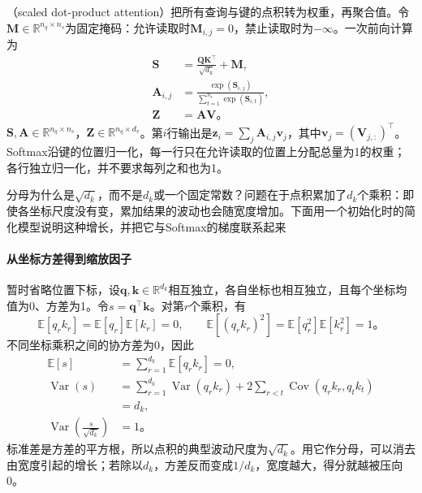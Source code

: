 （scaled dot-product attention）把所有查询与键的点积转为权重，再聚合值。令$\bm M\in\mathbb R^{n_q\times n_s}$为固定掩码：允许读取时$\bm M_{i,j}=0$，禁止读取时为$-\infty$。一次前向计算为
\begin{equation}
  \begin{aligned}
    \bm S&=\frac{\bm Q\bm K^{\top}}{\sqrt{d_k}}+\bm M,\\
    \bm A_{i,j}&=\frac{\exp(\bm S_{i,j})}
      {\sum_{t=1}^{n_s}\exp(\bm S_{i,t})},\\
    \bm Z&=\bm A\bm V\text{。}
  \end{aligned}
  \label{eq:transformer-attention}
\end{equation}
$\bm S,\bm A\in\mathbb R^{n_q\times n_s}$，$\bm Z\in\mathbb R^{n_q\times d_v}$。第$i$行输出是$\bm z_i=\sum_j\bm A_{i,j}\bm v_j$，其中$\bm v_j=(\bm V_{j,:})^{\top}$。Softmax沿键的位置归一化，每一行只在允许读取的位置上分配总量为1的权重；各行独立归一化，并不要求每列之和也为1。

分母为什么是$\sqrt{d_k}$，而不是$d_k$或一个固定常数？问题在于点积累加了$d_k$个乘积：即使各坐标尺度没有变，累加结果的波动也会随宽度增加。下面用一个初始化时的简化模型说明这种增长，并把它与Softmax的梯度联系起来

\paragraph{从坐标方差得到缩放因子}
暂时省略位置下标，设$\bm q,\bm k\in\mathbb R^{d_k}$相互独立，各自坐标也相互独立，且每个坐标均值为0、方差为1。令$s=\bm q^{\top}\bm k$。对第$r$个乘积，有
\[
  \mathbb E[q_rk_r]=\mathbb E[q_r]\mathbb E[k_r]=0,\qquad
  \mathbb E[(q_rk_r)^2]=\mathbb E[q_r^2]\mathbb E[k_r^2]=1\text{。}
\]
不同坐标乘积之间的协方差为0，因此
\begin{equation}
  \begin{aligned}
    \mathbb E[s]&=\sum_{r=1}^{d_k}\mathbb E[q_rk_r]=0,\\
    \operatorname{Var}(s)
      &=\sum_{r=1}^{d_k}\operatorname{Var}(q_rk_r)
        +2\sum_{r<t}\operatorname{Cov}(q_rk_r,q_tk_t)\\
      &=d_k,\\
    \operatorname{Var}\!\left(\frac{s}{\sqrt{d_k}}\right)&=1\text{。}
  \end{aligned}
  \label{eq:transformer-attention-scale-variance}
\end{equation}
标准差是方差的平方根，所以点积的典型波动尺度为$\sqrt{d_k}$。用它作分母，可以消去由宽度引起的增长；若除以$d_k$，方差反而变成$1/d_k$，宽度越大，得分就越被压向0。

